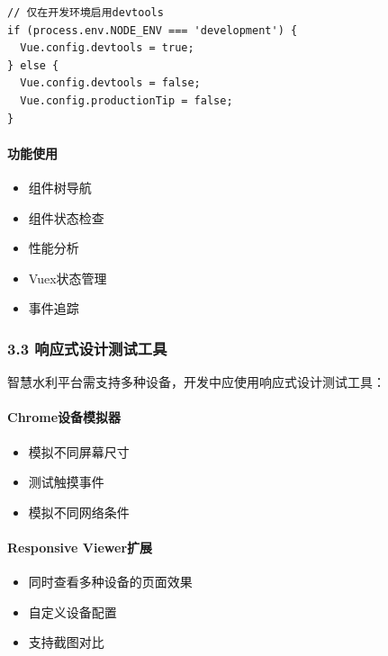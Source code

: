 \begin{lstlisting}
// 仅在开发环境启用devtools
if (process.env.NODE_ENV === 'development') {
  Vue.config.devtools = true;
} else {
  Vue.config.devtools = false;
  Vue.config.productionTip = false;
}
\end{lstlisting}

\paragraph{功能使用}\label{ux529fux80fdux4f7fux7528}

\begin{itemize}
\tightlist
\item
  组件树导航
\item
  组件状态检查
\item
  性能分析
\item
  Vuex状态管理
\item
  事件追踪
\end{itemize}

\subsubsection{3.3
响应式设计测试工具}\label{ux54cdux5e94ux5f0fux8bbeux8ba1ux6d4bux8bd5ux5de5ux5177}

智慧水利平台需支持多种设备，开发中应使用响应式设计测试工具：

\paragraph{Chrome设备模拟器}\label{chromeux8bbeux5907ux6a21ux62dfux5668}

\begin{itemize}
\tightlist
\item
  模拟不同屏幕尺寸
\item
  测试触摸事件
\item
  模拟不同网络条件
\end{itemize}

\paragraph{Responsive Viewer扩展}\label{responsive-viewerux6269ux5c55}

\begin{itemize}
\tightlist
\item
  同时查看多种设备的页面效果
\item
  自定义设备配置
\item
  支持截图对比
\end{itemize}

